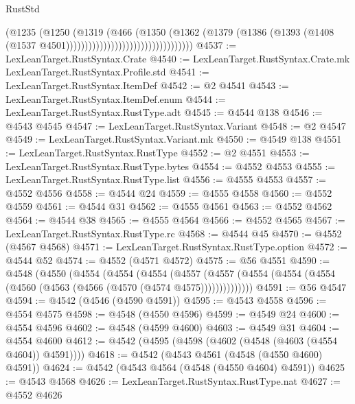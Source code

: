 \begin{lexlean}{RustStd}
\begin{coremodule}
                                                  (@1235
                                                    (@1250
                                                      (@1319
                                                        (@466
                                                          (@1350
                                                            (@1362
                                                              (@1379
                                                                (@1386
                                                                  (@1393
                                                                    (@1408
                                                                      (@1537
                                                                        @4501))))))))))))))))))))))))))))))))))
@4537 := LexLeanTarget.RustSyntax.Crate
@4540 := LexLeanTarget.RustSyntax.Crate.mk LexLeanTarget.RustSyntax.Profile.std
@4541 := LexLeanTarget.RustSyntax.ItemDef
@4542 := @2 @4541
@4543 := LexLeanTarget.RustSyntax.ItemDef.enum
@4544 := LexLeanTarget.RustSyntax.RustType.adt
@4545 := @4544 @138
@4546 := @4543 @4545
@4547 := LexLeanTarget.RustSyntax.Variant
@4548 := @2 @4547
@4549 := LexLeanTarget.RustSyntax.Variant.mk
@4550 := @4549 @138
@4551 := LexLeanTarget.RustSyntax.RustType
@4552 := @2 @4551
@4553 := LexLeanTarget.RustSyntax.RustType.bytes
@4554 := @4552 @4553
@4555 := LexLeanTarget.RustSyntax.RustType.list
@4556 := @4555 @4553
@4557 := @4552 @4556
@4558 := @4544 @24
@4559 := @4555 @4558
@4560 := @4552 @4559
@4561 := @4544 @31
@4562 := @4555 @4561
@4563 := @4552 @4562
@4564 := @4544 @38
@4565 := @4555 @4564
@4566 := @4552 @4565
@4567 := LexLeanTarget.RustSyntax.RustType.rc
@4568 := @4544 @45
@4570 := @4552 (@4567 @4568)
@4571 := LexLeanTarget.RustSyntax.RustType.option
@4572 := @4544 @52
@4574 := @4552 (@4571 @4572)
@4575 := @56 @4551
@4590 := @4548
    (@4550
      (@4554
        (@4554
          (@4554
            (@4557
              (@4557 (@4554 (@4554 (@4554 (@4560 (@4563 (@4566 (@4570 (@4574 @4575))))))))))))))
@4591 := @56 @4547
@4594 := @4542 (@4546 (@4590 @4591))
@4595 := @4543 @4558
@4596 := @4554 @4575
@4598 := @4548 (@4550 @4596)
@4599 := @4549 @24
@4600 := @4554 @4596
@4602 := @4548 (@4599 @4600)
@4603 := @4549 @31
@4604 := @4554 @4600
@4612 := @4542 (@4595 (@4598 (@4602 (@4548 (@4603 (@4554 @4604)) @4591))))
@4618 := @4542 (@4543 @4561 (@4548 (@4550 @4600) @4591))
@4624 := @4542 (@4543 @4564 (@4548 (@4550 @4604) @4591))
@4625 := @4543 @4568
@4626 := LexLeanTarget.RustSyntax.RustType.nat
@4627 := @4552 @4626

\end{coremodule}
\end{lexlean}

